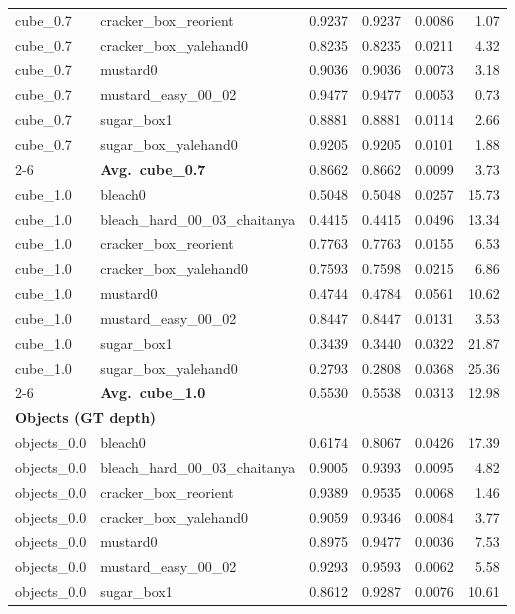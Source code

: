 \begin{longtable}{llrrrr}
  cube_0.7 & cracker\_box\_reorient & 0.9237 & 0.9237 & 0.0086 & 1.07 \\
  cube_0.7 & cracker\_box\_yalehand0 & 0.8235 & 0.8235 & 0.0211 & 4.32 \\
  cube_0.7 & mustard0 & 0.9036 & 0.9036 & 0.0073 & 3.18 \\
  cube_0.7 & mustard\_easy\_00\_02 & 0.9477 & 0.9477 & 0.0053 & 0.73 \\
  cube_0.7 & sugar\_box1 & 0.8881 & 0.8881 & 0.0114 & 2.66 \\
  cube_0.7 & sugar\_box\_yalehand0 & 0.9205 & 0.9205 & 0.0101 & 1.88 \\
  \cmidrule{2-6}
  & \textbf{Avg.~cube_0.7} & 0.8662 & 0.8662 & 0.0099 & 3.73 \\
  \midrule
  cube_1.0 & bleach0 & 0.5048 & 0.5048 & 0.0257 & 15.73 \\
  cube_1.0 & bleach\_hard\_00\_03\_chaitanya & 0.4415 & 0.4415 & 0.0496 & 13.34 \\
  cube_1.0 & cracker\_box\_reorient & 0.7763 & 0.7763 & 0.0155 & 6.53 \\
  cube_1.0 & cracker\_box\_yalehand0 & 0.7593 & 0.7598 & 0.0215 & 6.86 \\
  cube_1.0 & mustard0 & 0.4744 & 0.4784 & 0.0561 & 10.62 \\
  cube_1.0 & mustard\_easy\_00\_02 & 0.8447 & 0.8447 & 0.0131 & 3.53 \\
  cube_1.0 & sugar\_box1 & 0.3439 & 0.3440 & 0.0322 & 21.87 \\
  cube_1.0 & sugar\_box\_yalehand0 & 0.2793 & 0.2808 & 0.0368 & 25.36 \\
  \cmidrule{2-6}
  & \textbf{Avg.~cube_1.0} & 0.5530 & 0.5538 & 0.0313 & 12.98 \\
  \midrule
\multicolumn{6}{l}{\textbf{Objects (GT depth)}} \\
\midrule
  objects_0.0 & bleach0 & 0.6174 & 0.8067 & 0.0426 & 17.39 \\
  objects_0.0 & bleach\_hard\_00\_03\_chaitanya & 0.9005 & 0.9393 & 0.0095 & 4.82 \\
  objects_0.0 & cracker\_box\_reorient & 0.9389 & 0.9535 & 0.0068 & 1.46 \\
  objects_0.0 & cracker\_box\_yalehand0 & 0.9059 & 0.9346 & 0.0084 & 3.77 \\
  objects_0.0 & mustard0 & 0.8975 & 0.9477 & 0.0036 & 7.53 \\
  objects_0.0 & mustard\_easy\_00\_02 & 0.9293 & 0.9593 & 0.0062 & 5.58 \\
  objects_0.0 & sugar\_box1 & 0.8612 & 0.9287 & 0.0076 & 10.61 \\

\end{longtable}
